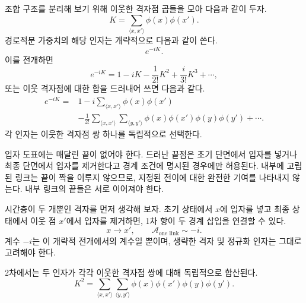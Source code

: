 조합 구조를 분리해 보기 위해 이웃한 격자점 곱들을 모아 다음과 같이 두자.\begin{equation}
K=\sum_{\langle x,x'\rangle}\phi(x)\phi(x').
\end{equation}경로적분 가중치의 해당 인자는 개략적으로 다음과 같이 쓴다.\begin{equation}
e^{-iK}.
\end{equation}이를 전개하면\begin{equation}
e^{-iK}
=1-iK-\frac{1}{2!}K^2+\frac{i}{3!}K^3+\cdots,
\end{equation}또는 이웃 격자점에 대한 합을 드러내어 쓰면 다음과 같다.\begin{align}
e^{-iK}
={}&1
-i\sum_{\langle x,x'\rangle}\phi(x)\phi(x')
\nonumber\\
&-\frac{1}{2!}
\sum_{\langle x,x'\rangle}
\sum_{\langle y,y'\rangle}
\phi(x)\phi(x')\phi(y)\phi(y')
+\cdots .
\end{align}각 인자는 이웃한 격자점 쌍 하나를 독립적으로 선택한다.

입자 도표에는 매달린 끝이 없어야 한다. 드러난 끝점은 초기 단면에서 입자를 넣거나 최종 단면에서 입자를 제거한다고 경계 조건에 명시된 경우에만 허용된다. 내부에 고립된 링크는 끝이 짝을 이루지 않으므로, 지정된 전이에 대한 완전한 기여를 나타내지 않는다. 내부 링크의 끝들은 서로 이어져야 한다.

시간층이 두 개뿐인 격자를 먼저 생각해 보자. 초기 상태에서 \(x\)에 입자를 넣고 최종 상태에서 이웃 점 \(x'\)에서 입자를 제거하면, 1차 항이 두 경계 삽입을 연결할 수 있다.\begin{equation}
x\longrightarrow x',
\qquad
\mathcal{A}_{\text{one link}}\sim -i.
\end{equation}계수 \(-i\)는 이 개략적 전개에서의 계수일 뿐이며, 생략한 격자 및 정규화 인자는 그대로 고려해야 한다.

\begin{classroomqa}
\end{classroomqa}

2차에서는 두 인자가 각각 이웃한 격자점 쌍에 대해 독립적으로 합산된다.\begin{equation}
K^2
=
\sum_{\langle x,x'\rangle}
\sum_{\langle y,y'\rangle}
\phi(x)\phi(x')\phi(y)\phi(y').
\end{equation}

